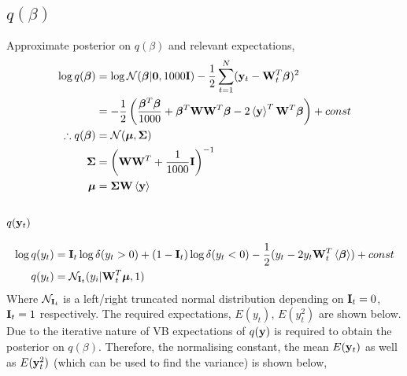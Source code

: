 \begin{appendices}
\subsection{$q(\beta)$}
\label{sec:class_beta}
Approximate posterior on $q(\beta)$ and relevant expectations,
\begin{align}
\nonumber\log q(\bm{\beta})&=\log {\mathcal{N}}(\bm{\beta}|{\mathbf{0}},1000\mathbf{I})-\frac{1}{2}\sum_{t=1}^{N}(\mathbf{y}_t-\mathbf{W}_t^T\bm{\beta})^2\\
\nonumber&=-\frac{1}{2}\left(\frac{\bm{\beta}^T\bm{\beta}}{1000}+\bm{\beta}^T\mathbf{W}\mathbf{W}^T\bm{\beta}-2\left\langle\mathbf{y}\right\rangle^T\mathbf{W}^T\bm{\beta}\right)+const\\
\therefore q(\bm{\beta})&={\mathcal{N}}({\boldsymbol{\mu}},{\mathbf{\Sigma}}) \label{eq:qb}\\
{\mathbf{\Sigma}}&=\left(\mathbf{W}\mathbf{W}^T+\frac{1}{1000}\mathbf{I}\right)^{-1}\\
{\boldsymbol{\mu}}&={\mathbf{\Sigma}}\mathbf{W}\left\langle\mathbf{y}\right\rangle
\end{align}

\subsection{$q(\mathbf{y}_t)$}
\label{sec:class_y}
\begin{align}
\nonumber\log q(y_t)&=\mathbf{I}_t\log \delta(y_t>0)+(1-\mathbf{I}_t)\log \delta(y_t<0)-\frac{1}{2}(y_t-2y_t\mathbf{W}_t^T\left\langle\bm{\beta}\right\rangle)+const\\
q(y_t)&={\mathcal{N}}_{\mathbf{I}_t}(y_i|\mathbf{W}_t^T{\boldsymbol{\mu}},1)
\end{align}
Where ${\mathcal{N}}_{\mathbf{I}_t}$ is a left/right truncated normal distribution depending on ${\mathbf{I}_t}=0$, ${\mathbf{I}_t}=1$ respectively. The required expectations, $E(y_t)$, $E(y_t^2)$ are shown below. Due to the iterative nature of VB expectations of $q(\mathbf{y})$ is required to obtain the posterior on $q(\beta)$. Therefore, the normalising constant, the mean $E(\mathbf{y}_t)$ as well as $E(\mathbf{y}_t^2)$ (which can be used to find the variance) is shown below,


\end{appendices}

